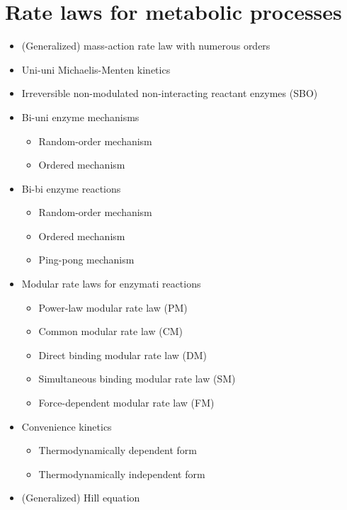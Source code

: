 \section{Rate laws for metabolic processes}
\begin{itemize}
  \item (Generalized) mass-action rate law with numerous orders \citep[p.~16]{Guldberg1879, Heinrich1996}
  \item Uni-uni Michaelis-Menten kinetics \citep{Michaelis1913}
  \item Irreversible non-modulated non-interacting reactant enzymes (SBO)
  \item Bi-uni enzyme mechanisms \citep{Segel1993, Bisswanger2000, Cornish-Bowden2004}
  \begin{itemize}
    \item Random-order mechanism
    \item Ordered mechanism
  \end{itemize}
  \item Bi-bi enzyme reactions \citep{Segel1993, Bisswanger2000, Cornish-Bowden2004}
  \begin{itemize}
    \item Random-order mechanism \citep[p.~169]{Cornish-Bowden2004}
    \item Ordered mechanism
    \item Ping-pong mechanism
  \end{itemize}
  \item Modular rate laws for enzymati reactions \citep{Liebermeister2010}
  \begin{itemize}
    \item Power-law modular rate law (PM)
    \item Common modular rate law (CM)
    \item Direct binding modular rate law (DM)
    \item Simultaneous binding modular rate law (SM)
    \item Force-dependent modular rate law (FM)
  \end{itemize}
  \item Convenience kinetics \citep{Liebermeister2006}
  \begin{itemize}
    \item Thermodynamically dependent form
    \item Thermodynamically independent form
  \end{itemize}
  \item (Generalized) Hill equation \citep[p.~314]{Hill1910, Cornish-Bowden2004}
\end{itemize}

